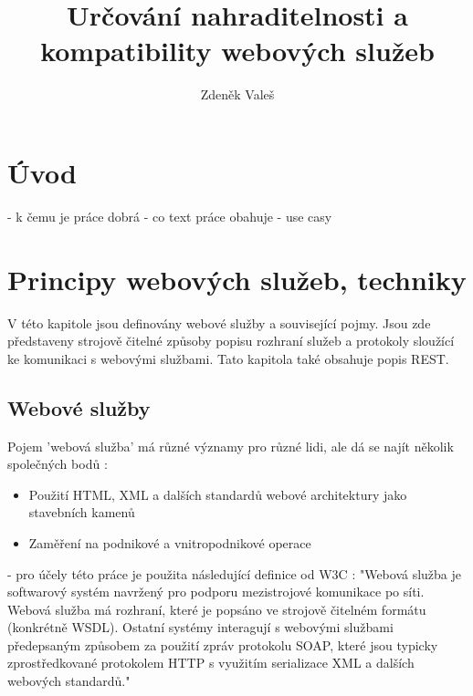 \documentclass[czech,DP]{thesiskiv}
\author{Zdeněk Valeš}
\title{Určování nahraditelnosti a\\kompatibility webových služeb}
\begin{document}
%
\maketitle
\tableofcontents

\chapter{Úvod}

- k čemu je práce dobrá
- co text práce obahuje
- use casy

\chapter{Principy webových služeb, techniky}
\label{sec:web-services-principles}

V této kapitole jsou definovány webové služby a související pojmy. Jsou zde představeny strojově čitelné způsoby popisu rozhraní služeb a protokoly sloužící ke komunikaci s webovými službami. Tato kapitola také obsahuje popis REST. 

%

\section{Webové služby}

Pojem 'webová služba' má různé významy pro různé lidi, ale dá se najít několik společných bodů \cite{w3cWsDesignIssues}:
\begin{itemize}
	\item Použití HTML, XML a dalších standardů webové architektury jako stavebních kamenů
	\item Zaměření na podnikové a vnitropodnikové operace
\end{itemize}

 - pro účely této práce je použita následující definice od W3C \cite{w3cWsArch}:
 "Webová služba je softwarový systém navržený pro podporu mezistrojové komunikace po síti. Webová služba má rozhraní, které je popsáno ve strojově čitelném formátu (konkrétně WSDL). Ostatní systémy interagují s webovými službami předepsaným způsobem za použití zpráv protokolu SOAP, které jsou typicky zprostředkované protokolem HTTP s využitím serializace XML a dalších webových standardů."
 
\end{document}
